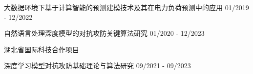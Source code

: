 
\begin{cventries}
    \vspace{-6.0mm}

    {
        \begin{cvitems}
            \item {
                \cvsubfunding
                {大数据环境下基于计算智能的预测建模技术及其在电力负荷预测中的应用}
                {01/2019 - 12/2022}
            }
            \item {
                \cvsubfunding
                {自然语言处理深度模型的对抗攻防关键算法研究}
                {01/2020 - 12/2023}
            }
        \end{cvitems}
    }

    \cvfunding
    {湖北省国际科技合作项目}
    {
        \begin{cvitems}
            \item {
                        \cvsubfunding
                        {深度学习模型对抗攻防基础理论与算法研究}
                        {09/2021 - 09/2023}
                  }
        \end{cvitems}
    }

\end{cventries}

\vspace{3.0mm}